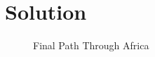 \documentclass[12pt]{article}
\begin{document}
\section{Solution}



\begin{figure}[!h]
  \begin{center}
    \setlength\fboxsep{1.00pt}
    \setlength\fboxrule{1.00pt}
    \caption{Final Path Through Africa}
  \end{center}
\end{figure}
\end{document}
